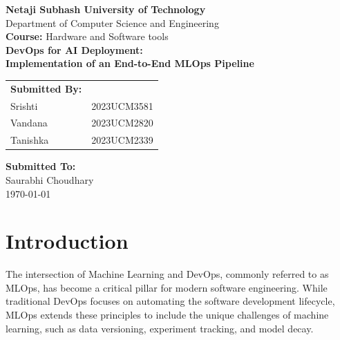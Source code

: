 \documentclass[12pt,a4paper]{article}
\begin{document}
\begin{titlepage}
    \centering
    \vspace*{1cm}
    {\huge \bfseries Netaji Subhash University of Technology} \\
    \vspace{0.5cm}
    {\Large Department of Computer Science and Engineering} \\
    \vspace{2cm}
    {\Large \textbf{Course:} Hardware and Software tools} \\
    \vspace{1cm}
    {\LARGE \bfseries DevOps for AI Deployment: \\ Implementation of an End-to-End MLOps Pipeline} \\
    \vspace{2cm}
    
    \begin{table}[h]
        \centering
        \begin{tabular}{ll}
            \textbf{Submitted By:} & \\
            Srishti & 2023UCM3581 \\
            Vandana & 2023UCM2820 \\
            Tanishka & 2023UCM2339 \\
        \end{tabular}
    \end{table}

    \vspace{2cm}
    {\large \textbf{Submitted To:}} \\
    {\large Saurabhi Choudhary} \\
    \vfill
    {\large \today}
\end{titlepage}

\newpage
\tableofcontents
\newpage

\section{Introduction}
The intersection of Machine Learning and DevOps, commonly referred to as MLOps, has become a critical pillar for modern software engineering. While traditional DevOps focuses on automating the software development lifecycle, MLOps extends these principles to include the unique challenges of machine learning, such as data versioning, experiment tracking, and model decay.
\end{document}
